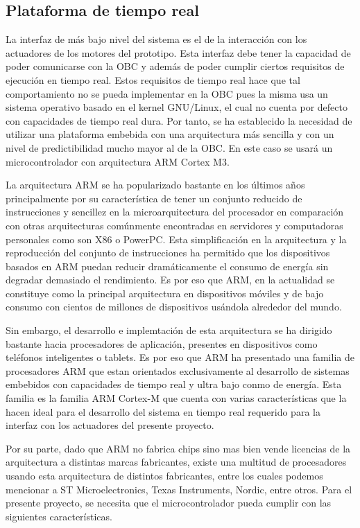     \subsection{Plataforma de tiempo real}
    La interfaz de más bajo nivel del sistema es el de la interacción con los actuadores de los motores del prototipo. Esta 
    interfaz debe tener la capacidad de poder comunicarse con la OBC y además de poder cumplir ciertos requisitos de ejecución 
    en tiempo real. Estos requisitos de tiempo real hace que tal comportamiento no se pueda implementar en la OBC pues la misma 
    usa un sistema operativo basado en el kernel GNU/Linux, el cual no cuenta por defecto con capacidades de tiempo real dura. 
    Por tanto, se ha establecido la necesidad de utilizar una plataforma embebida con una arquitectura más sencilla y con un 
    nivel de predictibilidad mucho mayor al de la OBC. En este caso se usará un microcontrolador con arquitectura ARM Cortex M3.

    La arquitectura ARM se ha popularizado bastante en los últimos años principalmente por su característica de tener un conjunto 
    reducido de instrucciones y sencillez en la microarquitectura del procesador en comparación con otras arquitecturas comúnmente 
    encontradas en servidores y computadoras personales como son X86 o PowerPC. Esta simplificación en la arquitectura y la reproducción
    del conjunto de instrucciones ha permitido que los dispositivos basados en ARM puedan reducir dramáticamente el consumo de 
    energía sin degradar demasiado el rendimiento. Es por eso que ARM, en la actualidad se constituye como la principal arquitectura en 
    dispositivos móviles y de bajo consumo con cientos de millones de dispositivos usándola alrededor del mundo.

    Sin embargo, el desarrollo e implemtación de esta arquitectura se ha dirigido bastante hacia procesadores de aplicación, presentes
    en dispositivos como teléfonos inteligentes o tablets. Es por eso que ARM ha presentado una familia de procesadores ARM que estan
    orientados exclusivamente al desarrollo de sistemas embebidos con capacidades de tiempo real y ultra bajo conmo de energía. Esta 
    familia es la familia ARM Cortex-M que cuenta con varias características que la hacen ideal para el desarrollo del sistema en tiempo 
    real requerido para la interfaz con los actuadores del presente proyecto.

    Por su parte, dado que ARM no fabrica chips sino mas bien vende licencias de la arquitectura a distintas marcas fabricantes, existe 
    una multitud de procesadores usando esta arquitectura de distintos fabricantes, entre los cuales podemos mencionar a ST Microelectronics,
    Texas Instruments, Nordic, entre otros. Para el presente proyecto, se necesita que el microcontrolador pueda cumplir con las 
    siguientes características. 

